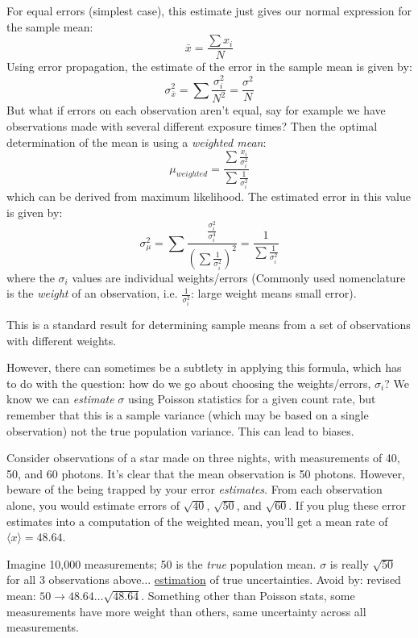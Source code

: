 \documentclass[12pt]{article}
\newcommand{\mynotes}[1]{\textcolor{myBlue}{#1}}
\begin{document}
For equal errors (simplest case), this estimate just gives our normal
expression for the sample mean:
\[
    \bar{x} = \frac{\sum x_{i}}{N} 
    \]
Using error propagation, the estimate of the error in the sample mean
is given by:
\[
     \sigma_{\bar{x}}^{2} = \sum\frac{\sigma_{i}^{2}}{N^{2}}
       = \frac{\sigma^{2}}{N}
       \]
But what if errors on each observation aren't equal, say for example
we have observations made with several different exposure times? Then
the optimal determination of the mean is using a \textit{weighted mean}:
\[
     \mu_{weighted} = \frac{\sum\frac{x_{i}}{\sigma_{i}^{2}}}
       {\sum\frac{1}{\sigma_{i}^{2}}} 
       \]
\mynotes{which can be derived from maximum likelihood.}
The estimated error in this value is given by:
\[
    \sigma_{\mu}^{2} = \sum\frac{\frac{\sigma_{i}^{2}}{\sigma_{i}^{4}}}
       {(\sum\frac{1}{\sigma_{i}^{2}})^{2}}
       = \frac{1}{\sum\frac{1}{\sigma_{i}^{2}}}
       \]
where the $\sigma_{i}$ values are individual weights/errors
(Commonly used nomenclature is the \emph{weight} of an observation, i.e.
$\frac{1}{\sigma_{i}^{2}}$: large weight means small error).

This is a standard result for determining sample means from a set of
observations with different weights.

However, there can sometimes be a subtlety in applying this formula, which has
to do with the question: how do we go about choosing the weights/errors,
$\sigma_{i}$? We know we can \emph{estimate} $\sigma$ using Poisson statistics
for a given count rate, but remember that this is a sample variance (which may
be based on a single observation) not the true population variance. This can
lead to biases.

Consider observations of a star made on three nights, with measurements of 40,
50, and 60 photons. It's clear that the mean observation is 50 photons.
However, beware of the being trapped by your error \emph{estimates}. From each
observation alone, you would estimate errors of $\sqrt{40}$, $\sqrt{50}$, and
$\sqrt{60}$. If you plug these error estimates into a computation of the
weighted mean, you'll get a mean rate of $ \langle x \rangle =48.64$.

\mynotes{Imagine 10,000 measurements; 50 is the \emph{true}
population mean. $\sigma$ is really $\sqrt{50}$ for all 3 observations
above$\ldots$ \underline{estimation} of true uncertainties.
Avoid by: revised mean: $50 \rightarrow 48.64 \ldots
\sqrt{48.64}$. Something other than Poisson stats, some measurements
have more weight than others, same uncertainty across all
measurements.}
\end{document}
